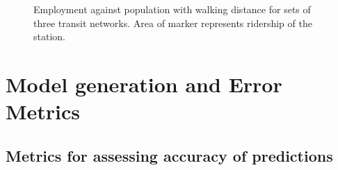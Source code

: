 \documentclass[11pt]{article}
\begin{document}
\begin{figure}
\centering
{}

\vspace{-15pt}
\captionsetup{singlelinecheck=off, justification=centering}
\caption[]{Employment against population with walking distance for sets of three transit networks.\linebreak
Area of marker represents ridership of the station.}\label{fig:networkvars}
\end{figure}


\section{Model generation and Error Metrics}

\subsection{Metrics for assessing accuracy of predictions}\label{sec:metric}
\end{document}
